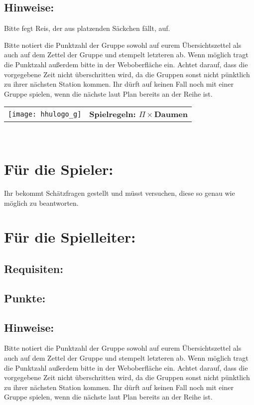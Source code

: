 \documentclass[a4paper,10pt]{article}
\def\spieli{$\Pi\times $Daumen}
\newcommand{\unten}{
 Bitte notiert die Punktzahl der Gruppe sowohl auf eurem Übersichtszettel als auch auf dem Zettel der Gruppe und stempelt letzteren ab. Wenn möglich tragt die Punktzahl außerdem bitte in der Weboberfläche ein.
 Achtet darauf, dass die vorgegebene Zeit nicht überschritten wird, da die Gruppen sonst nicht pünktlich zu ihrer nächsten Station kommen. Ihr dürft auf keinen Fall noch mit einer Gruppe spielen, wenn die nächste laut Plan bereits an der Reihe ist.
}
\begin{document}
\subsection*{Hinweise:}
Bitte fegt Reis, der aus platzenden Säckchen fällt, auf.
\unten

\newpage

  \begin{tabularx}{\textwidth}{lc}
    \texttt{[image: hhulogo\_g]}
  & {\Huge \textbf{Spielregeln: \spieli}}
  \end{tabularx}\\


\Large
\section*{Für die Spieler:}
Ihr bekommt Schätzfragen gestellt und müsst versuchen, diese so genau wie möglich
zu beantworten. 

\section*{Für die Spielleiter:}
\subsection*{Requisiten:} 
\subsection*{Punkte:}
\subsection*{Hinweise:}
\unten

\newpage
\end{document}
